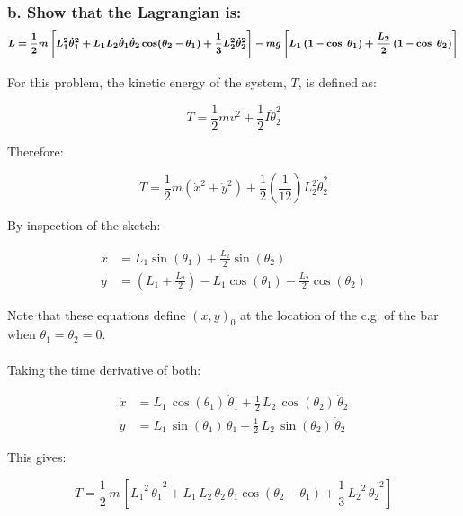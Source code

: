 \documentclass[12pt, letterpaper]{../assignment}
\begin{document}
\subsubsection*{b. Show that the Lagrangian is:
$$ \footnotesize \bm{L = \frac{1}{2}m\left[
    L_1^2 \dot{\theta}_1^2 +
    L_1 L_2 \dot{\theta}_1 \dot{\theta}_2 \cos(\theta_2-\theta_1) + 
    \frac{1}{3} {L}_2^2 \dot{\theta}_2^2
\right] - 
mg\left[ L_1 \left( 1 - \cos \ \theta_1  \right) + 
\frac{L_2}{2} \left( 1 - \cos\ \theta_2  \right)\right]} $$ }

For this problem, the kinetic energy of the system, $T$, is defined as:

$$ T = \frac{1}{2} m v^2 + \frac{1}{2} I \dot{\theta}_2^2 $$

Therefore:

$$ T = \frac{1}{2} m \left(\dot{x}^2 + \dot{y}^2\right) + \frac{1}{2}\left(\frac{1}{12}\right) L_2^2 \dot{\theta}_2^2 $$

By inspection of the sketch:

\begin{equation*}
\begin{aligned}
x &= L_1 \sin(\theta_1)+ \frac{L_2}{2} \sin(\theta_2)\\
y &= \left(L_1 + \frac{L_2}{2}\right) - L_1 \cos(\theta_1)- \frac{L_2}{2}\cos(\theta_2)
\end{aligned}
\end{equation*}

Note that these equations define $(x,y)_0$ at the location of the c.g. of the bar when $\theta_1 = \theta_2 = 0$.
\\\\

Taking the time derivative of both:

\begin{equation*}
    \begin{aligned}
    \dot{x} &= L_{1}\,\cos\left(\theta _{1}\right)\,\dot{\theta} _{1}+\frac{1}{2}\,L_{2}\,\cos\left(\theta _{2}\right)\,\dot{\theta} _{2} \\
    \dot{y} &= L_{1}\,\sin\left(\theta _{1}\right)\,\dot{\theta} _{1}+\frac{1}{2}\,L_{2}\,\sin\left(\theta _{2}\right)\,\dot{\theta} _{2}
    \end{aligned}
\end{equation*}

This gives:

$$ T = \frac{1}{2}\,m\,\left[{L_{1}}^2\,{\dot{\theta} _{1}}^2
+L_{1}\,L_{2}\,\dot{\theta} _{2}\,\dot{\theta} _{1}\cos\left(\theta _{2}-\theta _{1}\right)
+\frac{1}{3}\,{L_{2}}^2\,{\dot{\theta} _{2}}^2\right] $$
\end{document}
